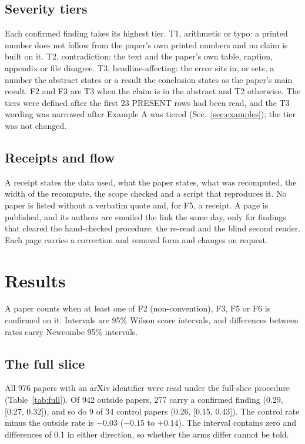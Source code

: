 \documentclass[reprint,amsmath,amssymb,aps,superscriptaddress,nofootinbib]{revtex4-2}
\begin{document}
\subsection{Severity tiers}

Each confirmed finding takes its highest tier. T1, arithmetic or typo: a printed number does not follow from the paper's own printed numbers and no claim is built on it. T2, contradiction: the text and the paper's own table, caption, appendix or file disagree. T3, headline-affecting: the error sits in, or sets, a number the abstract states or a result the conclusion states as the paper's main result. F2 and F3 are T3 when the claim is in the abstract and T2 otherwise. The tiers were defined after the first 23 PRESENT rows had been read, and the T3 wording was narrowed after Example A was tiered (Sec.~\ref{sec:examples}); the tier was not changed.

\subsection{Receipts and flow}

A receipt states the data used, what the paper states, what was recomputed, the width of the recompute, the scope checked and a script that reproduces it. No paper is listed without a verbatim quote and, for F5, a receipt. A page is published, and its authors are emailed the link the same day, only for findings that cleared the hand-checked procedure: the re-read and the blind second reader. Each page carries a correction and removal form and changes on request.

\section{Results}

A paper counts when at least one of F2 (non-convention), F3, F5 or F6 is confirmed on it. Intervals are 95\% Wilson score intervals, and differences between rates carry Newcombe 95\% intervals.

\subsection{The full slice}
\label{sec:full}

All 976 papers with an arXiv identifier were read under the full-slice procedure (Table~\ref{tab:full}). Of 942 outside papers, 277 carry a confirmed finding (0.29, [0.27, 0.32]), and so do 9 of 34 control papers (0.26, [0.15, 0.43]). The control rate minus the outside rate is $-0.03$ ($-0.15$ to $+0.14$). The interval contains zero and differences of 0.1 in either direction, so whether the arms differ cannot be told.
\end{document}
